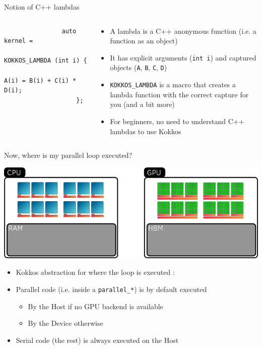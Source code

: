 \documentclass[
    aspectratio=169,
    handout,
]{beamer}
\begin{document}
\begin{frame}[fragile]{Notion of C++ lambdas}
    \begin{columns}
        \begin{column}{0.5\linewidth}
            \begin{verbatim}
                auto kernel =
                    KOKKOS_LAMBDA (int i) {
                        A(i) = B(i) + C(i) * D(i);
                    };
            \end{verbatim}
        \end{column}
        \begin{column}{0.5\linewidth}
            \begin{itemize}
                \item A lambda is a C++ anonymous function (i.e. a function as an object)
                \item It has explicit arguments (\texttt{int i}) and captured objects (\texttt{A}, \texttt{B}, \texttt{C}, \texttt{D})
                \item \texttt{KOKKOS\_LAMBDA} is a macro that creates a lambda function with the correct capture for you (and a bit more)
                \item For beginners, no need to understand C++ lambdas to use Kokkos
            \end{itemize}
        \end{column}
    \end{columns}
\end{frame}


\begin{frame}{Now, where is my parallel loop executed?}
    \begin{center}
        \includegraphics[width=0.8\linewidth]{execution_space.png}
    \end{center}
    \begin{itemize}
        \item Kokkos abstraction for where the loop is executed : 
        \item Parallel code (i.e. inside a \texttt{parallel\_*}) is by default executed
        \begin{itemize}
            \item By the Host if no GPU backend is available
            \item By the Device otherwise
        \end{itemize}
        \item Serial code (the rest) is always executed on the Host
    \end{itemize}
\end{frame}
\end{document}

